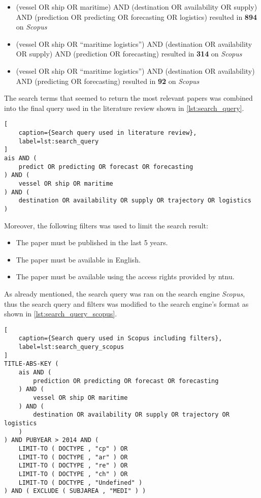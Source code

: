 \begin{itemize}
    \item (vessel OR ship OR maritime) AND (destination OR availability OR supply) AND (prediction OR predicting OR forecasting OR logistics) resulted in \textbf{894} on \textit{Scopus}
    \item (vessel OR ship OR ``maritime logistics'') AND (destination OR availability OR supply) AND (prediction OR forecasting) resulted in \textbf{314} on \textit{Scopus}
    \item (vessel OR ship OR ``maritime logistics'') AND (destination OR availability) AND (predicting OR forecasting) resulted in \textbf{92} on \textit{Scopus}
\end{itemize}

The search terms that seemed to return the most relevant papers was combined into the final query used in the literature review shown in \cref{lst:search_query}.

\begin{lstlisting}[
    caption={Search query used in literature review},
    label=lst:search_query
]
ais AND (
    predict OR predicting OR forecast OR forecasting
) AND (
    vessel OR ship OR maritime
) AND (
    destination OR availability OR supply OR trajectory OR logistics
)
\end{lstlisting}

Moreover, the following filters was used to limit the search result:

\begin{itemize}
    \item The paper must be published in the last 5 years.
    \item The paper must be available in English.
    \item The paper must be available using the access rights provided by \acrshort{ntnu}.
\end{itemize}

As already mentioned, the search query was ran on the search engine \textit{Scopus}, thus the search query and filters was modified to the search engine's format as shown in \cref{lst:search_query_scopus}.

\begin{lstlisting}[
    caption={Search query used in Scopus including filters},
    label=lst:search_query_scopus
]
TITLE-ABS-KEY (
    ais AND (
        prediction OR predicting OR forecast OR forecasting
    ) AND (
        vessel OR ship OR maritime
    ) AND (
        destination OR availability OR supply OR trajectory OR logistics
    )
) AND PUBYEAR > 2014 AND (
    LIMIT-TO ( DOCTYPE , "cp" ) OR
    LIMIT-TO ( DOCTYPE , "ar" ) OR
    LIMIT-TO ( DOCTYPE , "re" ) OR
    LIMIT-TO ( DOCTYPE , "ch" ) OR
    LIMIT-TO ( DOCTYPE , "Undefined" )
) AND ( EXCLUDE ( SUBJAREA , "MEDI" ) )
\end{lstlisting}

